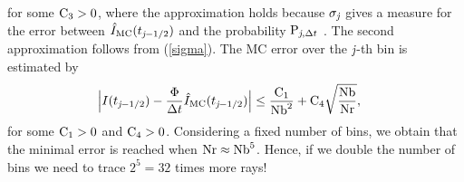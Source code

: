 for some $\textrm{C}_3>0$, where the approximation holds because $\sigma_{\textit{j}}$ gives a measure for the error between
$\hat{I}_{\textrm{MC}}(t_{\textit{j}-1/2})$ and the probability $\textrm{P}_{\textit{j}, \Delta t}$ \cite{diez2012openintro}. The second approximation follows from (\ref{sigma}). The MC error over the $\textit{j}$-th bin is estimated by
\begin{equation} \begin{aligned}
\Big|I(t_{\textit{j}-1/2})&-\frac{\Phi}
{\Delta t}\hat{I}_{\textrm{MC}}(t_{\textit{j}-1/2})\Big| \leq
\frac{\textrm{C}_1}{\textrm{Nb}^2} + \textrm{C}_4\sqrt{\frac{\textrm{Nb}}{\textrm{Nr}}},
\end{aligned}
\end{equation}
for some $\textrm{C}_1>0$ and $\textrm{C}_4>0$.
Considering a fixed number of bins, we obtain that the minimal error is reached when $\textrm{Nr}\approx \textrm{Nb}^5$.
Hence, if we double the number of bins we need to trace $2^5 = 32$ times more rays!

